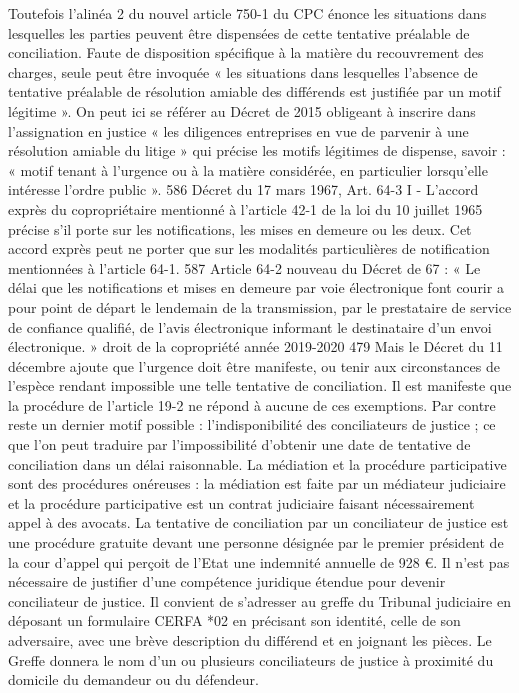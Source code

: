 Toutefois l’alinéa 2 du nouvel article 750-1 du CPC énonce les situations dans lesquelles les parties peuvent être dispensées de cette tentative préalable de conciliation. Faute de disposition spécifique à la matière du recouvrement des charges, seule peut être invoquée « les situations dans lesquelles l’absence de tentative préalable de résolution amiable des différends est justifiée par un motif légitime ».
On peut ici se référer au Décret de 2015 obligeant à inscrire dans l’assignation en justice « les diligences entreprises en vue de parvenir à une résolution amiable du litige » qui précise les motifs légitimes de dispense, savoir : « motif tenant à l’urgence ou à la matière considérée, en particulier lorsqu’elle intéresse l’ordre public ».
586 Décret du 17 mars 1967, Art. 64-3 I - L'accord exprès du copropriétaire mentionné à l’article 42-1 de la loi du 10 juillet 1965 précise s’il porte sur les notifications, les mises en demeure ou les deux. Cet accord exprès peut ne porter que sur les modalités particulières de notification mentionnées à l’article 64-1.
587 Article 64-2 nouveau du Décret de 67 : « Le délai que les notifications et mises en demeure par voie électronique font courir a pour point de départ le lendemain de la transmission, par le prestataire de service de confiance qualifié, de l’avis électronique informant le destinataire d’un envoi électronique. »
droit de la copropriété année 2019-2020
479
Mais le Décret du 11 décembre ajoute que l’urgence doit être manifeste, ou tenir aux circonstances de l’espèce rendant impossible une telle tentative de conciliation.
Il est manifeste que la procédure de l’article 19-2 ne répond à aucune de ces exemptions.
Par contre reste un dernier motif possible : l’indisponibilité des conciliateurs de justice ; ce que l’on peut traduire par l’impossibilité d’obtenir une date de tentative de conciliation dans un délai raisonnable.
La médiation et la procédure participative sont des procédures onéreuses : la médiation est faite par un médiateur judiciaire et la procédure participative est un contrat judiciaire faisant nécessairement appel à des avocats.
La tentative de conciliation par un conciliateur de justice est une procédure gratuite devant une personne désignée par le premier président de la cour d’appel qui perçoit de l’Etat une indemnité annuelle de 928 €. Il n’est pas nécessaire de justifier d’une compétence juridique étendue pour devenir conciliateur de justice.
Il convient de s’adresser au greffe du Tribunal judiciaire en déposant un formulaire CERFA *02 en précisant son identité, celle de son adversaire, avec une brève description du différend et en joignant les pièces. Le Greffe donnera le nom d’un ou plusieurs conciliateurs de justice à proximité du domicile du demandeur ou du défendeur.
